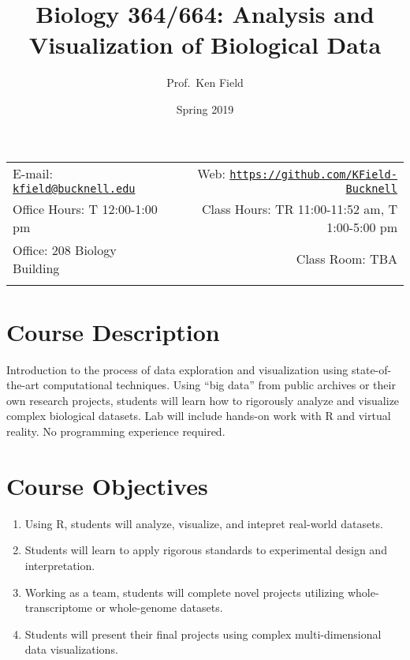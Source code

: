 \documentclass[11pt,]{article}
\title{Biology 364/664: Analysis and Visualization of Biological Data}
\author{Prof.~Ken Field}
\date{Spring 2019}
\begin{document}
  

		\maketitle
		
	
		\thispagestyle{firststyle}



	\noindent \begin{tabular*}{\textwidth}{ @{\extracolsep{\fill}} lr @{\extracolsep{\fill}}}


E-mail: \texttt{\href{mailto:kfield@bucknell.edu}{\nolinkurl{kfield@bucknell.edu}}} & Web: \href{http://\url{https://github.com/KField-Bucknell}}{\tt \url{https://github.com/KField-Bucknell}}\\
Office Hours: T 12:00-1:00 pm  &  Class Hours: TR 11:00-11:52 am, T 1:00-5:00 pm\\
Office: 208 Biology Building  & Class Room: TBA\\
	&  \\
	\hline
	\end{tabular*}
	
\vspace{2mm}
	


\hypertarget{course-description}{%
\section{Course Description}\label{course-description}}

Introduction to the process of data exploration and visualization using
state-of-the-art computational techniques. Using ``big data'' from
public archives or their own research projects, students will learn how
to rigorously analyze and visualize complex biological datasets. Lab
will include hands-on work with R and virtual reality. No programming
experience required.

\hypertarget{course-objectives}{%
\section{Course Objectives}\label{course-objectives}}

\begin{enumerate}
\def\labelenumi{\arabic{enumi}.}
\item
  Using R, students will analyze, visualize, and intepret real-world
  datasets.
\item
  Students will learn to apply rigorous standards to experimental design
  and interpretation.
\item
  Working as a team, students will complete novel projects utilizing
  whole-transcriptome or whole-genome datasets.
\item
  Students will present their final projects using complex
  multi-dimensional data visualizations.
\end{enumerate}
\end{document}
